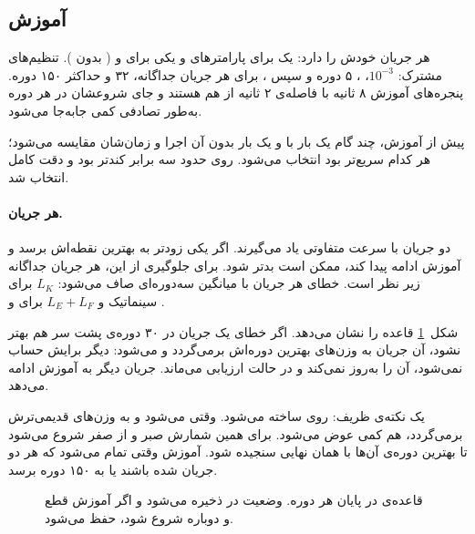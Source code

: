 \subsection{آموزش}

هر جریان  خودش را دارد: یک  برای پارامترهای  و یکی برای  و  ( بدون ). تنظیم‌های مشترک:  $10^{-3}$،  ، ۵ دوره  و سپس ،   برای هر جریان جداگانه،  ۳۲ و حداکثر ۱۵۰ دوره. پنجره‌های آموزش ۸ ثانیه با فاصله‌ی ۲ ثانیه از هم هستند و جای شروعشان در هر دوره به‌طور تصادفی کمی جابه‌جا می‌شود.

پیش از آموزش، چند گام یک بار با  و یک بار بدون آن اجرا و زمان‌شان مقایسه می‌شود؛ هر کدام سریع‌تر بود انتخاب می‌شود. روی   حدود سه برابر کندتر بود و دقت کامل انتخاب شد.

\paragraph{ هر جریان.} دو جریان با سرعت متفاوتی یاد می‌گیرند. اگر یکی زودتر به بهترین نقطه‌اش برسد و آموزش ادامه پیدا کند، ممکن است بدتر شود. برای جلوگیری از این، هر جریان جداگانه زیر نظر است. خطای  هر جریان با میانگین سه‌دوره‌ای صاف می‌شود: $L_K$ برای سینماتیک و $L_E+L_F$ برای  و .

شکل~\ref{fig:freeze} قاعده را نشان می‌دهد. اگر خطای یک جریان در ۳۰ دوره‌ی پشت سر هم بهتر نشود، آن جریان به وزن‌های بهترین دوره‌اش برمی‌گردد و  می‌شود: دیگر  برایش حساب نمی‌شود،  آن را به‌روز نمی‌کند و در حالت ارزیابی می‌ماند. جریان دیگر به آموزش ادامه می‌دهد.

یک نکته‌ی ظریف:  روی  ساخته می‌شود. وقتی   می‌شود و به وزن‌های قدیمی‌ترش برمی‌گردد،  هم کمی عوض می‌شود. برای همین شمارش صبر  و  از صفر شروع می‌شود تا بهترین دوره‌ی آن‌ها با همان  نهایی سنجیده شود. آموزش وقتی تمام می‌شود که هر دو جریان  شده باشند یا به ۱۵۰ دوره برسد.

\begin{figure}[htbp]
\centering

\caption{قاعده‌ی  در پایان هر دوره. وضعیت  در  ذخیره می‌شود و اگر آموزش قطع و دوباره شروع شود، حفظ می‌شود.}
\label{fig:freeze}
\end{figure}

